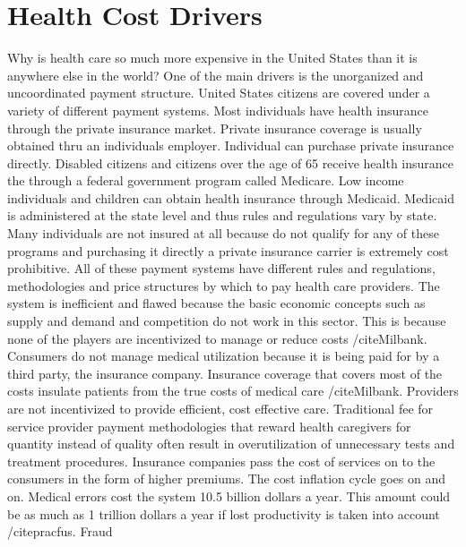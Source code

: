 \documentclass[sigconf]{acmart}
\begin{document}
\section{Health Cost Drivers}

Why is health care so much more expensive in the United States than it is anywhere else in the world?  One of the main drivers is the unorganized and uncoordinated payment structure.  United States citizens are covered under a variety of different payment systems. Most individuals have health insurance through the private insurance market.  Private insurance coverage is usually obtained thru an individuals employer. Individual can purchase private insurance directly.   Disabled citizens and citizens over the age of 65 receive health insurance the through a federal government program called Medicare. Low income individuals and children can obtain health insurance through Medicaid. Medicaid is administered at the state level and thus rules and regulations vary by state.  Many individuals are not insured at all because do not qualify for any of these programs and purchasing it directly a private insurance carrier is extremely cost prohibitive.  All of these payment systems have different rules and regulations, methodologies and price structures by which to pay health care providers.
The system is inefficient and flawed because the basic economic concepts such as supply and demand and competition do not work in this sector. This is because none of the players are incentivized to manage or reduce costs /cite{Milbank}.  Consumers do not manage medical utilization because it is being paid for by a third party, the insurance company.  Insurance coverage that covers most of the costs insulate patients from the true costs of medical care /cite{Milbank}. Providers are not incentivized to provide efficient, cost effective care.  Traditional fee for service provider payment methodologies that reward health caregivers for quantity instead of quality often result in overutilization of unnecessary tests and treatment procedures.  Insurance companies pass the cost of services on to the consumers in the form of higher premiums. The cost inflation cycle goes on and on.  
Medical errors cost the system 10.5 billion dollars a year. This amount could be as much as 1 trillion dollars a year if lost productivity is taken into account /cite{pracfus}.
Fraud
\end{document}
